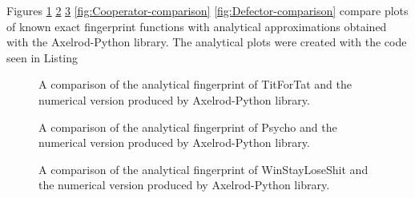 Figures \ref{fig:TFT-comparison} \ref{fig:Psycho-comparison} \ref{fig:WSLS-comparison} \ref{fig:Cooperator-comparison} \ref{fig:Defector-comparison} compare plots of known exact fingerprint functions with analytical approximations obtained with the Axelrod-Python library.
The analytical plots were created with the code seen in Listing

\begin{figure}[htbp!]
\caption{A comparison of the analytical fingerprint of TitForTat and the numerical version produced by Axelrod-Python library.}
\label{fig:TFT-comparison}
\end{figure}
\begin{figure}[htbp!]
\caption{A comparison of the analytical fingerprint of Psycho and the numerical version produced by Axelrod-Python library.}
\label{fig:Psycho-comparison}
\end{figure}
\begin{figure}[htbp!]
\caption{A comparison of the analytical fingerprint of WinStayLoseShit and the numerical version produced by Axelrod-Python library.}
\label{fig:WSLS-comparison}
\end{figure}
